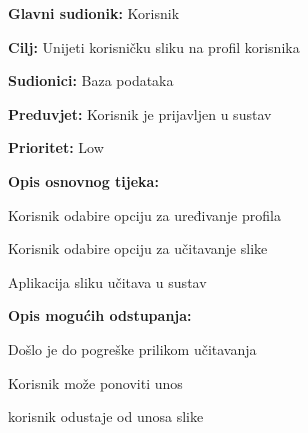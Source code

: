 \noindent {}
    \begin{packed_item}
    	
    	\item \textbf{Glavni sudionik:} Korisnik 
    	\item \textbf{Cilj:} Unijeti korisničku sliku na profil korisnika
    	\item \textbf{Sudionici:} Baza podataka
    	\item \textbf{Preduvjet:} Korisnik je prijavljen u sustav
    	\item \textbf{Prioritet:} Low
    	\item \textbf{Opis osnovnog tijeka:}
    	
    	\item[] \begin{packed_enum}
    		
    		\item Korisnik odabire opciju za uređivanje profila
    		\item Korisnik odabire opciju za učitavanje slike
    		\item Aplikacija sliku učitava u sustav
    		
    	\end{packed_enum}
    	
    	\item  \textbf{Opis mogućih odstupanja:}
    	
    	\item[] \begin{packed_item}
    		
    		\item[2.a] Došlo je do pogreške prilikom učitavanja
    		\item[] \begin{packed_enum}
    			
    			\item Korisnik može ponoviti unos 
    			\item korisnik odustaje od unosa slike
    			
    		\end{packed_enum}
    	\end{packed_item}
    \end{packed_item}

